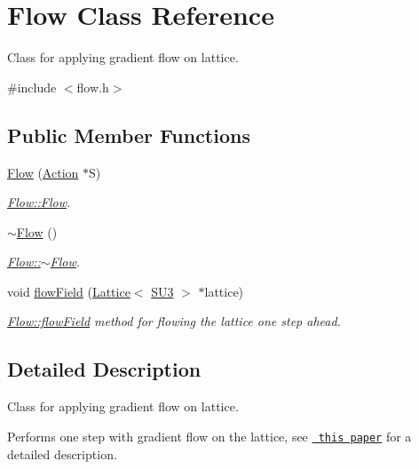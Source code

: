 \hypertarget{class_flow}{}\section{Flow Class Reference}
\label{class_flow}


Class for applying gradient flow on lattice.  




{\ttfamily \#include $<$flow.\+h$>$}

\subsection*{Public Member Functions}
\begin{DoxyCompactItemize}
\item 
\mbox{\hyperlink{class_flow_a25ae85599c0ae330374f0840efde7ebc}{Flow}} (\mbox{\hyperlink{class_action}{Action}} $\ast$S)
\begin{DoxyCompactList}\small\item\em \mbox{\hyperlink{class_flow_a25ae85599c0ae330374f0840efde7ebc}{Flow\+::\+Flow}}. \end{DoxyCompactList}\item 
\mbox{\hyperlink{class_flow_a5991efa6e8cf88c4ef2125cc727db333}{$\sim$\+Flow}} ()
\begin{DoxyCompactList}\small\item\em \mbox{\hyperlink{class_flow_a5991efa6e8cf88c4ef2125cc727db333}{Flow\+::$\sim$\+Flow}}. \end{DoxyCompactList}\item 
void \mbox{\hyperlink{class_flow_a284b490ddedc9cf5d0f2ab0660c328f6}{flow\+Field}} (\mbox{\hyperlink{class_lattice}{Lattice}}$<$ \mbox{\hyperlink{class_s_u3}{S\+U3}} $>$ $\ast$lattice)
\begin{DoxyCompactList}\small\item\em \mbox{\hyperlink{class_flow_a284b490ddedc9cf5d0f2ab0660c328f6}{Flow\+::flow\+Field}} method for flowing the lattice one step ahead. \end{DoxyCompactList}\end{DoxyCompactItemize}


\subsection{Detailed Description}
Class for applying gradient flow on lattice. 

Performs one step with gradient flow on the lattice, see \href{https://arxiv.org/abs/1006.4518}{\texttt{ this paper}} for a detailed description.

